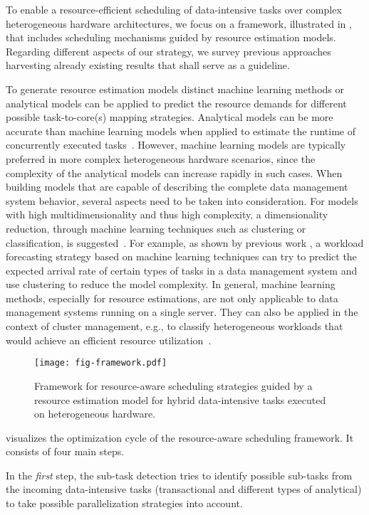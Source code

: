 \documentclass[11pt]{article}
\begin{document}
To enable a resource-efficient scheduling of data-intensive tasks over complex heterogeneous hardware architectures,
we focus on a framework, illustrated in ,
that includes scheduling mechanisms guided by resource estimation models.
Regarding different aspects of our strategy,
we survey previous approaches harvesting already existing results that shall serve as a guideline.

To generate resource estimation models distinct machine learning methods or analytical models
can be applied to predict the resource demands for different possible task-to-core(s) mapping strategies.
Analytical models can be more accurate than machine learning models
when applied to estimate the runtime of concurrently executed tasks~\cite{Wu_2013}.
However,
machine learning models are typically preferred in more complex heterogeneous hardware scenarios,
since the complexity of the analytical models can increase rapidly in such cases. 
When building models that are capable of describing the complete data management system behavior,
several aspects need to be taken into consideration.
For models with high multidimensionality and thus high complexity,
a dimensionality reduction, through machine learning techniques such as clustering or classification,
is suggested~\cite{Chen_2011}.
For example, as shown by previous work \cite{Ma_2018},
a workload forecasting strategy based on machine learning techniques can try to predict
the expected arrival rate of certain types of tasks in a data management system
and use clustering to reduce the model complexity.
In general, machine learning methods, especially for resource estimations,
are not only applicable to data management systems running on a single server.
They can also be applied in the context of cluster management,
e.g., to classify heterogeneous workloads that would achieve an efficient resource utilization~\cite{Delimitrou_2014}.

\begin{figure}
	\centering
	\texttt{[image: fig-framework.pdf]}
	\caption{Framework for resource-aware scheduling strategies guided by a resource estimation model for hybrid data-intensive tasks executed on heterogeneous hardware.}
	\label{fig:framework}
\end{figure}

 visualizes the optimization cycle of the resource-aware scheduling framework.
It consists of four main steps.

In the \textit{first} step,
the sub-task detection tries to identify possible sub-tasks from the incoming data-intensive tasks
(transactional and different types of analytical) to take possible parallelization strategies into account.
\end{document}
